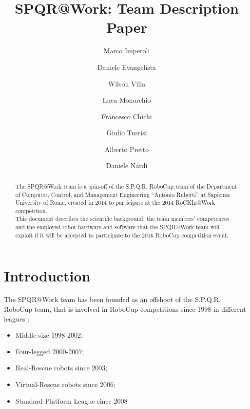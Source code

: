 \documentclass{llncs}
\begin{document}
%
\title{SPQR@Work: Team Description Paper}

\author{Marco Imperoli \and Daniele Evangelista \and Wilson Villa \and Luca Monorchio \and Francesco Chichi \and Giulio Turrisi \and Alberto Pretto \and Daniele Nardi}


\maketitle

\begin{abstract}
The SPQR@Work team is a spin-off of the S.P.Q.R. RoboCup team of the Department of Computer, Control, and Management Engineering “Antonio Ruberti” at Sapienza University of Rome, created in 2014 to participate at the 2014 RoCKIn@Work competition.\\
This document describes the scientific background, the team members' competences and the employed robot hardware and software that the SPQR@Work team will exploit if it will be accepted to participate to the 2016 RoboCup competition event.
\end{abstract}

\section{Introduction}
The SPQR@Work team has been founded as an offshoot of the S.P.Q.R. RoboCup team, that is involved in RoboCup competitions since 1998 in different leagues :
\begin{itemize}
\item Middle-size 1998-2002;
\item Four-legged 2000-2007;
\item Real-Rescue robots since 2003;
\item Virtual-Rescue robots since 2006;
\item Standard Platform League since 2008
 \end{itemize}
\end{document}
